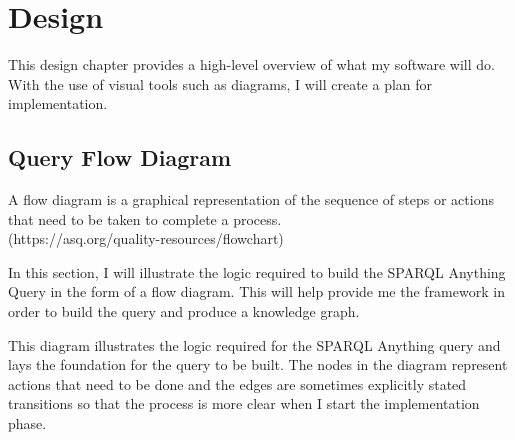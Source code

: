 \chapter{Design}
This design chapter provides a high-level overview of what my software will do. With the use of visual tools such as diagrams, I will create a plan for implementation. 

\section{Query Flow Diagram}
\hspace{0.5cm} A flow diagram is a graphical representation of the sequence of steps or actions that need to be taken to complete a process. 
\\ (https://asq.org/quality-resources/flowchart)

In this section, I will illustrate the logic required to build the SPARQL Anything Query in the form of a flow diagram. This will help provide me the framework in order to build the query and produce a knowledge graph.

\bigskip
\begin{center}
\end{center}

This diagram illustrates the logic required for the SPARQL Anything query and lays the foundation for the query to be built. The nodes in the diagram represent actions that need to be done and the edges are sometimes explicitly stated transitions so that the process is more clear when I start the implementation phase.

